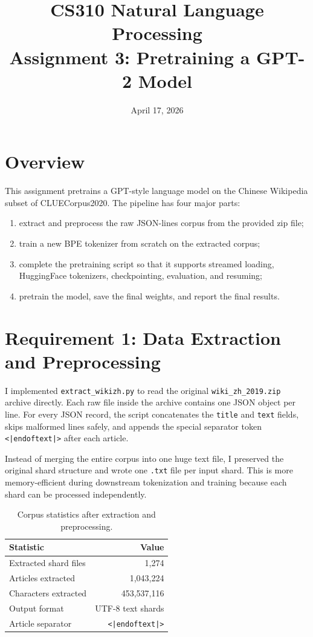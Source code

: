 \documentclass[11pt]{article}
\title{CS310 Natural Language Processing\\Assignment 3: Pretraining a GPT-2 Model}
\author{}
\date{April 17, 2026}
\begin{document}
\maketitle

\section{Overview}
This assignment pretrains a GPT-style language model on the Chinese Wikipedia subset of CLUECorpus2020. The pipeline has four major parts:
\begin{enumerate}[leftmargin=1.5em]
  \item extract and preprocess the raw JSON-lines corpus from the provided zip file;
  \item train a new BPE tokenizer from scratch on the extracted corpus;
  \item complete the pretraining script so that it supports streamed loading, HuggingFace tokenizers, checkpointing, evaluation, and resuming;
  \item pretrain the model, save the final weights, and report the final results.
\end{enumerate}

\section{Requirement 1: Data Extraction and Preprocessing}
I implemented \texttt{extract\_wikizh.py} to read the original \texttt{wiki\_zh\_2019.zip} archive directly. Each raw file inside the archive contains one JSON object per line. For every JSON record, the script concatenates the \texttt{title} and \texttt{text} fields, skips malformed lines safely, and appends the special separator token \texttt{<|endoftext|>} after each article.

Instead of merging the entire corpus into one huge text file, I preserved the original shard structure and wrote one \texttt{.txt} file per input shard. This is more memory-efficient during downstream tokenization and training because each shard can be processed independently.

\begin{table}[H]
\centering
\begin{tabular}{lr}
\toprule
Statistic & Value \\
\midrule
Extracted shard files & 1,274 \\
Articles extracted & 1,043,224 \\
Characters extracted & 453,537,116 \\
Output format & UTF-8 text shards \\
Article separator & \texttt{<|endoftext|>} \\
\bottomrule
\end{tabular}
\caption{Corpus statistics after extraction and preprocessing.}
\end{table}
\end{document}
